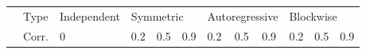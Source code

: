 \begin{tabular}{p{0.2cm}p{1cm}|p{0.6cm}p{0.6cm}|p{0.6cm}p{0.6cm}p{0.6cm}p{0.6cm}p{0.6cm}p{0.6cm}|p{0.6cm}p{0.6cm}p{0.6cm}p{0.6cm}p{0.6cm}p{0.6cm}|p{0.6cm}p{0.6cm}p{0.6cm}p{0.6cm}p{0.6cm}p{0.6cm}}

\hline

& Type& \multicolumn{2}{l|}{Independent} & \multicolumn{6}{l|}{Symmetric} & \multicolumn{6}{l|}{Autoregressive} & \multicolumn{6}{l}{Blockwise} \\ 

& Corr.& \multicolumn{2}{l|}{0} & \multicolumn{2}{l}{0.2} & \multicolumn{2}{l}{0.5} & \multicolumn{2}{l|}{0.9} & \multicolumn{2}{l}{0.2} & \multicolumn{2}{l}{0.5} & \multicolumn{2}{l|}{0.9} & \multicolumn{2}{l}{0.2} & \multicolumn{2}{l}{0.5} & \multicolumn{2}{l}{0.9} \\  


\end{tabular}
